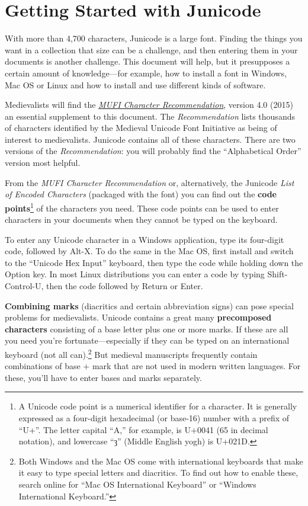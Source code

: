 \documentclass[12pt,letterpaper,openany]{book}
\begin{document}
\chapter*{\color{RViolet}Getting Started with Junicode}\hypertarget{GettingStarted}{}

With more than 4,700 characters, Junicode is a large font. Finding the things you
want in a collection that size can be a challenge, and then entering them in your
documents is another challenge. This document will help, but it
presupposes a certain amount of knowledge—for example, how to install a font in
Windows, Mac OS or Linux and how to install and use different kinds of software.

Medievalists will find the \href{https://bora.uib.no/bora-xmlui/handle/1956/10699}%
{\textit{MUFI Character Recommendation}}, version 4.0 (2015)
an essential supplement to this document. The \textit{Recommendation} lists
thousands of characters identified by the
Medieval Unicode Font Initiative as being of interest to medievalists. Junicode
contains all of these characters. There are two versions of the \textit{Recommendation}:
you will probably find the “Alphabetical Order” version most helpful.

From the \textit{MUFI Character Recommendation} or, alternatively, the Junicode
\textit{List of Encoded Characters} (packaged with the font) you can find out
the \textbf{code points}\footnote{A Unicode code point is a numerical identifier for a character.
It is generally expressed as a
four-digit hexadecimal (or base-16) number with a prefix of ``U+''. The letter
capital ``A,'' for example, is U+0041 (65
in decimal notation), and lowercase ``ȝ'' (Middle English yogh) is U+021D.}
of the characters you need. These code points can be used to enter
characters in your documents when they cannot be typed on the keyboard.

To enter any Unicode character in a Windows application, type its four-digit
code, followed by Alt-X. To do the same in the Mac OS, first install and switch
to the “Unicode Hex Input” keyboard, then type the code while holding down the Option
key. In most Linux distributions you can enter a code by typing Shift-Control-U,
then the code followed by Return or Enter.

\textbf{Combining marks} (diacritics and certain abbreviation signs) can pose special problems for
medievalists. Unicode contains a great
many \textbf{precomposed characters} consisting of a base letter plus one or more marks.
If these are all you need you're fortunate---especially if they can be
typed on an international keyboard (not all can).\footnote{Both
Windows and the Mac OS come with international keyboards that make it easy to
type special letters and diacritics. To find out how to enable these, search
online for “Mac OS International Keyboard” or “Windows International Keyboard.”}
But medieval manuscripts frequently contain
combinations of base + mark that are not used in modern written languages.
For these, you'll have to
enter bases and marks separately.
\end{document}
